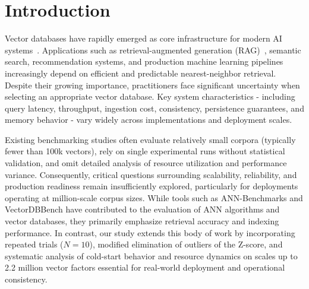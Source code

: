 \documentclass{article}
\begin{document}
\section{Introduction}
Vector databases have rapidly emerged as core infrastructure for modern AI systems~\cite{xie2023brief,jing2025large}. Applications such as retrieval-augmented generation (RAG)~\cite{lewis2020rag}, semantic search, recommendation systems, and production machine learning pipelines increasingly depend on efficient and predictable nearest-neighbor retrieval\cite{csakar2025maximizing}. Despite their growing importance, practitioners face significant uncertainty when selecting an appropriate vector database. Key system characteristics - including query latency, throughput, ingestion cost, consistency, persistence guarantees, and memory behavior - vary widely across implementations and deployment scales.

Existing benchmarking studies often evaluate relatively small corpora (typically fewer than 100k vectors), rely on single experimental runs without statistical
validation, and omit detailed analysis of resource utilization and performance variance. Consequently, critical questions surrounding scalability, reliability,
and production readiness remain insufficiently explored, particularly for deployments operating at million-scale corpus sizes. While tools such as ANN-Benchmarks and VectorDBBench have contributed to the evaluation of ANN algorithms and vector databases, they primarily emphasize retrieval accuracy and indexing performance. In contrast, our study extends this body of work by incorporating repeated trials ($N=10$), modified elimination of outliers of the Z-score, and systematic analysis of cold-start behavior and resource dynamics on scales up to 2.2 million vector factors essential for real-world deployment and
operational consistency.
\end{document}
